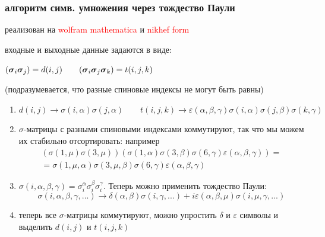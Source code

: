 \documentclass{beamer}
\begin{document}
\begin{frame}
\frametitle{алгоритм симв. умножения через тождество Паули}
реализован на \textcolor{red}{wolfram mathematica} и \textcolor{red}{nikhef form}

входные и выходные данные задаются в виде: 

$({\boldsymbol{\sigma}}_i {\boldsymbol{\sigma}}_j) = d(i,j) \qquad ({\boldsymbol{\sigma}}_i {\boldsymbol{\sigma}}_j {\boldsymbol{\sigma}}_k) = t(i,j,k)$

(подразумевается, что разные спиновые индексы не могут быть равны)

\begin{enumerate}
\item 
$d(i,j)\rightarrow\sigma(i,\alpha)\sigma(j,\alpha)\qquad
t(i,j,k)\rightarrow\varepsilon(\alpha,\beta,\gamma)\sigma(i,\alpha)\sigma(j,\beta)\sigma(k,\gamma)$
\item $\sigma$-матрицы с разными спиновыми индексами коммутируют, так что мы можем их стабильно отсортировать:
например
$$\begin{gathered}
(\sigma(1,\mu)\sigma(3,\mu))(\sigma(1,\alpha)\sigma(3,\beta)\sigma(6,\gamma)\varepsilon(\alpha,\beta,\gamma)) = \\
=\sigma(1,\mu,\alpha) \sigma(3,\mu,\beta) \sigma(6,\gamma) \varepsilon(\alpha,\beta,\gamma)
\end{gathered}
$$
\item $\sigma(i,\alpha,\beta,\gamma)=\sigma_i^\alpha \sigma_i^\beta \sigma_i^\gamma.$ Теперь можно применить тождество Паули: 
	$$\sigma(i,\alpha,\beta,\gamma,...)\rightarrow
	\delta(\alpha,\beta)\sigma(i,\gamma,...)+i \varepsilon(\alpha,\beta,\mu)\sigma(i,\mu,\gamma,...)$$
\item теперь все $\sigma$-матрицы коммутируют, можно упростить $\delta$ и $\varepsilon$ символы и выделить $d(i,j)$ и $t(i,j,k)$
\end{enumerate}
\end{frame}
\end{document}

